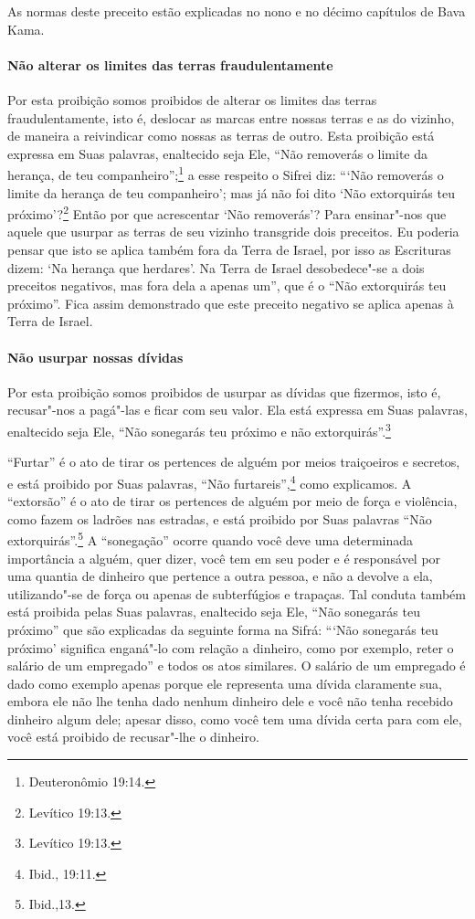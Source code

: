 \begin{multicols}{2}
As normas deste preceito estão explicadas no nono e no décimo capítulos de Bava Kama\starr.

\paragraph{Não alterar os limites das terras fraudulentamente}

Por esta proibição somos proibidos de alterar os limites das terras
fraudulentamente, isto é, deslocar as marcas entre nossas terras e as do
vizinho, de maneira a reivindicar como nossas as terras de outro. Esta
proibição está expressa em Suas palavras, enaltecido seja Ele, ``Não
removerás o limite da herança, de teu companheiro'';\footnote{Deuteronômio
19:14.} a esse respeito o Sifrei\starr{} diz: ```Não removerás o limite da
herança de teu companheiro'; mas já não foi dito `Não extorquirás teu
próximo'?\footnote{Levítico 19:13.} Então por que acrescentar `Não removerás'?
Para ensinar"-nos que aquele que usurpar as terras de seu vizinho
transgride dois preceitos. Eu poderia pensar que isto se aplica também
fora da Terra de Israel, por isso as Escrituras dizem: `Na herança que
herdares'. Na Terra de Israel desobedece"-se a dois preceitos negativos,
mas fora dela a apenas um'', que é o ``Não extorquirás teu próximo''.
Fica assim demonstrado que este preceito negativo se aplica apenas à
Terra de Israel.

\paragraph{Não usurpar nossas dívidas}

Por esta proibição somos proibidos de usurpar as dívidas que fizermos,
isto é, recusar"-nos a pagá"-las e ficar com seu valor. Ela está expressa
em Suas palavras, enaltecido seja Ele, ``Não sonegarás teu próximo e não
extorquirás''.\footnote{Levítico 19:13.}

``Furtar'' é o ato de tirar os pertences de alguém por meios
traiçoeiros e secretos, e está proibido por Suas palavras, ``Não
furtareis'',\footnote{Ibid., 19:11.} como explicamos. A ``extorsão'' é o ato de
tirar os pertences de alguém por meio de força e violência, como fazem
os ladrões nas estradas, e está proibido por Suas palavras ``Não
extorquirás''.\footnote{Ibid.,13.} A ``sonegação'' ocorre quando você deve uma
determinada importância a alguém, quer dizer, você tem em seu poder e é
responsável por uma quantia de dinheiro que pertence a outra pessoa, e
não a devolve a ela, utilizando"-se de força ou apenas de subterfúgios e
trapaças. Tal conduta também está proibida pelas Suas palavras,
enaltecido seja Ele, ``Não sonegarás teu próximo'' que são explicadas da
seguinte forma na Sifrá\starr: ```Não sonegarás teu próximo' significa
enganá"-lo com relação a dinheiro, como por exemplo, reter o salário de
um empregado'' e todos os atos similares. O salário de um empregado é
dado como exemplo apenas porque ele representa uma dívida claramente
sua, embora ele não lhe tenha dado nenhum dinheiro dele e você não
tenha recebido dinheiro algum dele; apesar disso, como você tem uma
dívida certa para com ele, você está proibido de recusar"-lhe o dinheiro.


\end{multicols}
